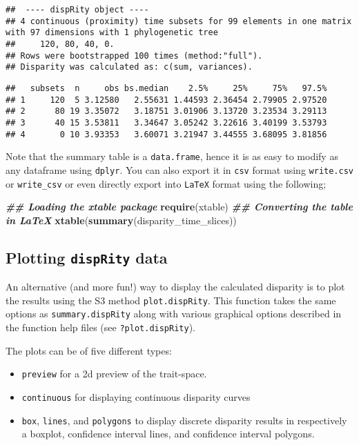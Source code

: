 \documentclass[
]{book}
\newenvironment{Shaded}{\begin{snugshade}}{\end{snugshade}}
\newcommand{\DocumentationTok}[1]{\textcolor[rgb]{0.56,0.35,0.01}{\textbf{\textit{#1}}}}
\newcommand{\FunctionTok}[1]{\textcolor[rgb]{0.13,0.29,0.53}{\textbf{#1}}}
\newcommand{\NormalTok}[1]{#1}
\providecommand{\tightlist}{%
  \setlength{\itemsep}{0pt}\setlength{\parskip}{0pt}}
\begin{document}
\begin{verbatim}
##  ---- dispRity object ---- 
## 4 continuous (proximity) time subsets for 99 elements in one matrix with 97 dimensions with 1 phylogenetic tree
##     120, 80, 40, 0.
## Rows were bootstrapped 100 times (method:"full").
## Disparity was calculated as: c(sum, variances).
\end{verbatim}

\begin{verbatim}
##   subsets  n     obs bs.median    2.5%     25%     75%   97.5%
## 1     120  5 3.12580   2.55631 1.44593 2.36454 2.79905 2.97520
## 2      80 19 3.35072   3.18751 3.01906 3.13720 3.23534 3.29113
## 3      40 15 3.53811   3.34647 3.05242 3.22616 3.40199 3.53793
## 4       0 10 3.93353   3.60071 3.21947 3.44555 3.68095 3.81856
\end{verbatim}

Note that the summary table is a \texttt{data.frame}, hence it is as easy to modify as any dataframe using \texttt{dplyr}.
You can also export it in \texttt{csv} format using \texttt{write.csv} or \texttt{write\_csv} or even directly export into \texttt{LaTeX} format using the following;

\begin{Shaded}
\begin{Highlighting}[]
\DocumentationTok{\#\# Loading the xtable package}
\FunctionTok{require}\NormalTok{(xtable)}
\DocumentationTok{\#\# Converting the table in LaTeX}
\FunctionTok{xtable}\NormalTok{(}\FunctionTok{summary}\NormalTok{(disparity\_time\_slices))}
\end{Highlighting}
\end{Shaded}

\hypertarget{plotting-disprity-data}{%
\subsection{\texorpdfstring{Plotting \texttt{dispRity} data}{Plotting dispRity data}}\label{plotting-disprity-data}}

An alternative (and more fun!) way to display the calculated disparity is to plot the results using the S3 method \texttt{plot.dispRity}.
This function takes the same options as \texttt{summary.dispRity} along with various graphical options described in the function help files (see \texttt{?plot.dispRity}).

The plots can be of five different types:

\begin{itemize}
\tightlist
\item
  \texttt{preview} for a 2d preview of the trait-space.
\item
  \texttt{continuous} for displaying continuous disparity curves
\item
  \texttt{box}, \texttt{lines}, and \texttt{polygons} to display discrete disparity results in respectively a boxplot, confidence interval lines, and confidence interval polygons.
\end{itemize}
\end{document}

